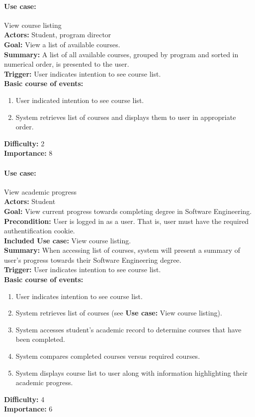 \documentclass[12pt]{article}
\begin{document}
\paragraph*{Use case:} View course listing\\
\textbf{Actors:} Student, program director\\
\textbf{Goal:} View a list of available courses.\\
\textbf{Summary:} A list of all available courses, grouped by program and sorted in numerical order, is presented to the user.\\
\textbf{Trigger:} User indicates intention to see course list.\\
\textbf{Basic course of events:}
\begin{enumerate}
\item User indicated intention to see course list.
\item System retrieves list of courses and displays them to user in appropriate order.
\end{enumerate}
\textbf{Difficulty:} 2\\
\textbf{Importance:} 8\\


\paragraph*{Use case:} View academic progress\\
\textbf{Actors:} Student\\
\textbf{Goal:} View current progress towards completing degree in Software Engineering.\\
\textbf{Precondition:} User is logged in as a user. That is, user must have the required authentification cookie.\\
\textbf{Included Use case:} View course listing.\\
\textbf{Summary:} When accessing list of courses, system will present a summary of user's progress towards their Software Engineering degree.\\
\textbf{Trigger:} User indicates intention to see course list.\\
\textbf{Basic course of events:}
\begin{enumerate}
\item User indicates intention to see course list.
\item System retrieves list of courses (see \textbf{Use case:} View course listing).
\item System accesses student's academic record to determine courses that have been
completed.
\item System compares completed courses versus required courses.
\item System displays course list to user along with information highlighting their
academic progress.
\end{enumerate}
\textbf{Difficulty:} 4\\
\textbf{Importance:} 6\\
\end{document}
